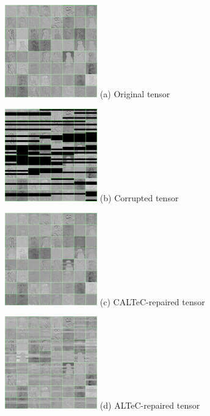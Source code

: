 \documentclass[conference,letterpaper]{IEEEtran}
\begin{document}
\begin{figure}[tb]
 \center
		\begin{minipage}[b]{0.24\linewidth}
		\centering
		\includegraphics[width=4cm]{tiledoriginalgrid.jpg}
		(a) Original tensor
	\end{minipage}
\begin{minipage}[b]{0.24\linewidth}
	\centering
	\includegraphics[width=4cm]{tileddamagedgrid.jpg}
	(b) Corrupted tensor
\end{minipage}
%
\begin{minipage}[b]{0.24\linewidth}
	\centering
	\includegraphics[width=4cm]{tiledcaltecgrid.jpg}
	(c) CALTeC-repaired tensor
	\end{minipage}
\begin{minipage}[b]{0.24\linewidth}
	\centering
	\includegraphics[width=4cm]{tiledaltecgrid.jpg}
	(d) ALTeC-repaired tensor
\end{minipage}

\end{figure}
\end{document}

